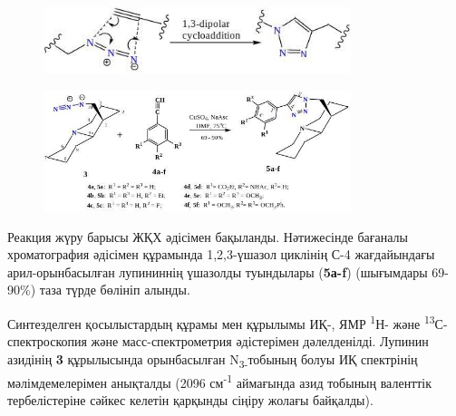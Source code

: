 \begin{figure}[H]
	\centering
	\includegraphics[width=0.8\textwidth]{assets/1012}
	\caption*{}
\end{figure}

\begin{figure}[H]
	\centering
	\includegraphics[width=0.8\textwidth]{assets/1013}
	\caption*{}
\end{figure}

Реакция жүру барысы ЖҚХ әдісімен бақыланды. Нәтижесінде бағаналы
хроматография әдісімен құрамында 1,2,3-үшазол циклінің С-4 жағдайындағы
арил-орынбасылған лупининнің үшазолды туындылары (\textbf{5а-f})
(шығымдары 69-90\%) таза түрде бөлініп алынды.

Синтезделген қосылыстардың құрамы мен құрылымы ИҚ-, ЯМР
\textsuperscript{1}Н- және \textsuperscript{13}С- спектроскопия және
масс-спектрометрия әдістерімен дәлелденілді. Лупинин азидінің \textbf{3}
құрылысында орынбасылған N\textsubscript{3-}тобының болуы ИҚ спектрінің
мәлімдемелерімен анықталды (2096 см\textsuperscript{-1} аймағында азид
тобының валенттік тербелістеріне сәйкес келетін қарқынды сіңіру жолағы
байқалды).

